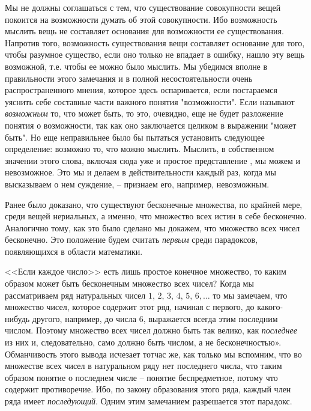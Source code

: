 \documentclass[12pt]{extarticle}
\begin{document}
Мы не должны соглашаться с тем, что существование совокупности вещей покоится на возможности думать об этой совокупности. Ибо возможность мыслить вещь не составляет основания для возможности ее существования. Напротив того, возможность существования вещи составляет основание для того, чтобы разумное существо, если оно только не впадает в ошибку, нашло эту вещь возможной, т.е. чтобы ее можно было мыслить. Мы убедимся вполне в правильности этого замечания и в полной несостоятельности очень распространенного мнения, которое здесь оспаривается, если постараемся уяснить себе составные части важного понятия "возможности". Если называют \textit{возможным} то, что может быть, то это, очевидно, еще не будет разложение понятия о возможности, так как оно заключается целиком в выражении "может быть". Но еще неправильнее было бы пытаться установить следующее определение: возможно то, что можно мыслить. Мыслить, в собственном значении этого слова, включая сюда уже и простое представление , мы можем и невозможное. Это мы и делаем в действительности каждый раз, когда мы высказываем о нем суждение, – признаем его, например, невозможным.

Ранее было доказано, что существуют бесконечные множества, по крайней мере, среди вещей нериальных, а именно, что множество всех истин в себе бесконечно. Аналогично тому, как это было сделано мы докажем, что множество всех чисел бесконечно. Это положение будем считать \textit{первым} среди парадоксов, появляющихся в области математики.

<<Если каждое число>> есть лишь простое конечное множество, то каким образом может быть бесконечным множество всех чисел? Когда мы рассматриваем ряд натуральных чисел $1,\, 2,\, 3,\, 4,\, 5,\, 6, \ldots$ то мы замечаем, что множество чисел, которое содержит этот ряд, начиная с первого, до какого-нибудь другого, например, до числа 6, выражается всегда этим последним числом. Поэтому множество всех чисел должно быть так велико, как \textit{последнее} из них и, следовательно, само должно быть числом, а не бесконечностью». Обманчивость этого вывода исчезает тотчас же, как только мы вспомним, что во множестве всех чисел в натуральном ряду нет последнего числа, что таким образом понятие о последнем числе – понятие беспредметное, потому что содержит противоречие. Ибо, по закону образования этого ряда, каждый член ряда имеет \textit{последующий}. Одним этим замечанием разрешается этот
парадокс.
\end{document}
